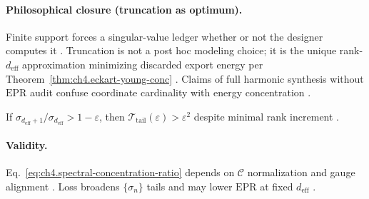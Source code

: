 \paragraph{Philosophical closure (truncation as optimum).}
Finite support forces a singular-value ledger whether or not the designer computes it \cite{stratton1941,hansen1988,harrington2001}. Truncation is
not a post hoc modeling choice; it is the unique rank-\(d_{\mathrm{eff}}\) approximation minimizing discarded export energy per
Theorem~\ref{thm:ch4.eckart-young-conc} \cite{devaney2004}. Claims of full harmonic synthesis without \(\mathrm{EPR}\) audit confuse coordinate
cardinality with energy concentration \cite{harrington2001,stratton1941}.

\begin{corollary}
\label{cor:ch4.tail-dominated}
If \(\sigma_{d_{\mathrm{eff}}+1}/\sigma_{d_{\mathrm{eff}}}>1-\varepsilon\), then \(\mathcal{T}_{\mathrm{tail}}(\varepsilon)>\varepsilon^{2}\) despite minimal rank increment
\cite{hansen1988,harrington2001,stratton1941,devaney2004}.
\end{corollary}

\paragraph{Validity.}
Eq.~\eqref{eq:ch4.spectral-concentration-ratio} depends on \(\mathcal{C}\) normalization and gauge alignment \cite{hansen1988,stratton1941}. Loss broadens
\(\{\sigma_{n}\}\) tails and may lower \(\mathrm{EPR}\) at fixed \(d_{\mathrm{eff}}\) \cite{harrington2001,devaney2004}.
